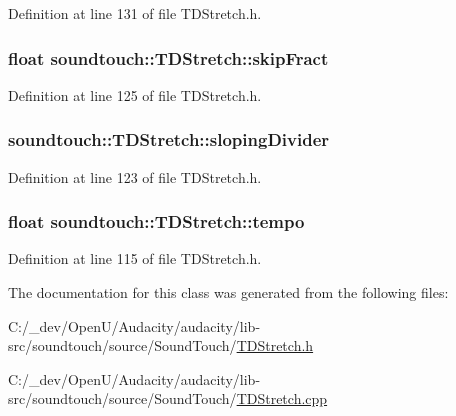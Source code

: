 Definition at line 131 of file T\+D\+Stretch.\+h.

\subsubsection[{\texorpdfstring{skip\+Fract}{skipFract}}]{\setlength{\rightskip}{0pt plus 5cm}float soundtouch\+::\+T\+D\+Stretch\+::skip\+Fract\hspace{0.3cm}{\ttfamily [protected]}}\hypertarget{classsoundtouch_1_1_t_d_stretch_ac1e7943634556e4fa61224bb0d14a726}{}\label{classsoundtouch_1_1_t_d_stretch_ac1e7943634556e4fa61224bb0d14a726}


Definition at line 125 of file T\+D\+Stretch.\+h.

\subsubsection[{\texorpdfstring{sloping\+Divider}{slopingDivider}}]{ soundtouch\+::\+T\+D\+Stretch\+::sloping\+Divider\hspace{0.3cm}{\ttfamily [protected]}}\hypertarget{classsoundtouch_1_1_t_d_stretch_aae7b05e586c9c992e2ade01264f8676b}{}\label{classsoundtouch_1_1_t_d_stretch_aae7b05e586c9c992e2ade01264f8676b}


Definition at line 123 of file T\+D\+Stretch.\+h.

\subsubsection[{\texorpdfstring{tempo}{tempo}}]{\setlength{\rightskip}{0pt plus 5cm}float soundtouch\+::\+T\+D\+Stretch\+::tempo\hspace{0.3cm}{\ttfamily [protected]}}\hypertarget{classsoundtouch_1_1_t_d_stretch_a97f816f5041ed44832049d51e6212cfa}{}\label{classsoundtouch_1_1_t_d_stretch_a97f816f5041ed44832049d51e6212cfa}


Definition at line 115 of file T\+D\+Stretch.\+h.



The documentation for this class was generated from the following files\+:\begin{DoxyCompactItemize}
\item 
C\+:/\+\_\+dev/\+Open\+U/\+Audacity/audacity/lib-\/src/soundtouch/source/\+Sound\+Touch/\hyperlink{_t_d_stretch_8h}{T\+D\+Stretch.\+h}\item 
C\+:/\+\_\+dev/\+Open\+U/\+Audacity/audacity/lib-\/src/soundtouch/source/\+Sound\+Touch/\hyperlink{_t_d_stretch_8cpp}{T\+D\+Stretch.\+cpp}\end{DoxyCompactItemize}
